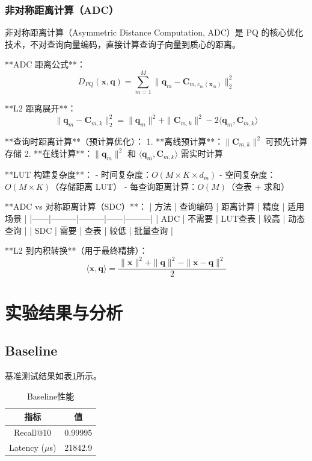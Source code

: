 \documentclass[a4paper]{article}
\begin{document}
\subsubsection{非对称距离计算（ADC）}

非对称距离计算（Asymmetric Distance Computation, ADC）是 PQ 的核心优化技术，不对查询向量编码，直接计算查询子向量到质心的距离。

**ADC 距离公式**：
$$D_{PQ}(\mathbf{x}, \mathbf{q}) = \sum_{m=1}^{M} \|\mathbf{q}_m - \mathbf{C}_{m, c_m(\mathbf{x}_m)}\|_2^2$$

**L2 距离展开**：
$$\|\mathbf{q}_m - \mathbf{C}_{m,k}\|_2^2 = \|\mathbf{q}_m\|^2 + \|\mathbf{C}_{m,k}\|^2 - 2\langle \mathbf{q}_m, \mathbf{C}_{m,k} \rangle$$

**查询时距离计算**（预计算优化）：
1. **离线预计算**：$\|\mathbf{C}_{m,k}\|^2$ 可预先计算存储
2. **在线计算**：$\|\mathbf{q}_m\|^2$ 和 $\langle \mathbf{q}_m, \mathbf{C}_{m,k} \rangle$ 需实时计算

**LUT 构建复杂度**：
- 时间复杂度：$O(M \times K \times d_m)$
- 空间复杂度：$O(M \times K)$（存储距离 LUT）
- 每查询距离计算：$O(M)$（查表 + 求和）

**ADC vs 对称距离计算（SDC）**：
| 方法 | 查询编码 | 距离计算 | 精度 | 适用场景 |
|------|---------|---------|------|---------|
| ADC | 不需要 | LUT查表 | 较高 | 动态查询 |
| SDC | 需要 | 查表 | 较低 | 批量查询 |

**L2 到内积转换**（用于最终精排）：
$$\langle \mathbf{x}, \mathbf{q} \rangle = \frac{\|\mathbf{x}\|^2 + \|\mathbf{q}\|^2 - \|\mathbf{x} - \mathbf{q}\|^2}{2}$$

\section{实验结果与分析}

\subsection{Baseline}

基准测试结果如表\ref{table:baseline}所示。

\begin{table}[!htbp]
  \centering
  \begin{tabular}{cc}
  \toprule  
  \textbf{指标} & \textbf{值} \\
  \midrule
  Recall@10 & 0.99995 \\
  Latency ($\mu$s) & 21842.9 \\
  \bottomrule
  \end{tabular}
  \caption{Baseline性能}
  \label{table:baseline}
\end{table}
\end{document}
